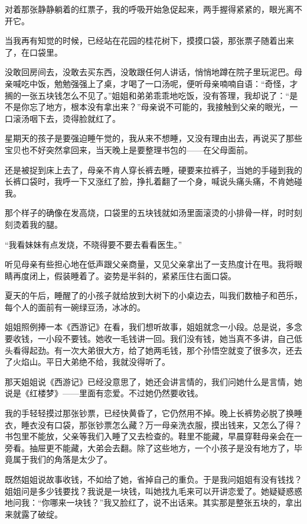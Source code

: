 \par 对着那张静静躺着的红票子，我的呼吸开始急促起来，两手握得紧紧的，眼光离不开它。
\par 当我再有知觉的时候，已经站在花园的桂花树下，摸摸口袋，那张票子随着出来了，在口袋里。
\par 没敢回房间去，没敢去买东西，没敢跟任何人讲话，悄悄地蹲在院子里玩泥巴。母亲喊吃中饭，勉勉强强上了桌，才喝了一口汤呢，便听母亲喃喃自语：“奇怪，才搁的一张五块钱怎么不见了。”姐姐和弟弟乖乖地吃饭，没有答理，我却说了：“是不是你忘了地方，根本没有拿出来？”母亲说不可能的，我接触到父亲的眼光，一口滚汤咽下去，烫得脸就红了。
\par 星期天的孩子是要强迫睡午觉的，我从来不想睡，又没有理由出去，再说买了那些宝贝也不好突然拿回来，当天晚上是要整理书包的——在父母面前。
\par 还是被捉到床上去了，母亲不肯人穿长裤去睡，硬要来拉裤子，当她的手碰到我的长裤口袋时，我呼一下又涨红了脸，挣扎着翻了一个身，喊说头痛头痛，不肯她碰我。
\par 那个样子的确像在发高烧，口袋里的五块钱就如汤里面滚烫的小排骨一样，时时刻刻烫着我的腿。
\par “我看妹妹有点发烧，不晓得要不要去看看医生。”
\par 听见母亲有些担心地在低声跟父亲商量，又见父亲拿出了一支热度计在甩。我将眼睛再度闭上，假装睡着了。姿势是半斜的，紧紧压住右面口袋。
\par 夏天的午后，睡醒了的小孩子就给放到大树下的小桌边去，叫我们数柚子和芭乐，每个人的面前有一碗绿豆汤，冰冰的。
\par 姐姐照例捧一本《西游记》在看，我们想听故事，姐姐就念一小段。总是说，多念要收钱，一小段不要钱。她收一毛钱讲一回。我们没有钱，她当真不多讲，自己低头看得起劲。有一次大弟很大方，给了她两毛钱，那个孙悟空就变了很多次，还去了火焰山。平日大弟绝不给，我就没得听了。
\par 那天姐姐说《西游记》已经没意思了，她还会讲言情的，我们问她什么是言情，她说是《红楼梦》——里面有恋爱。不过她仍然要收钱。
\par 我的手轻轻摸过那张钞票，已经快黄昏了，它仍然用不掉。晚上长裤势必脱了换睡衣，睡衣没有口袋，那张钞票怎么藏？万一母亲洗衣服，摸出钱来，又怎么了得？书包里不能放，父亲等我们入睡了又去检查的。鞋里不能藏，早晨穿鞋母亲会在一旁看。抽屉更不能藏，大弟会去翻。除了这些地方，一个小孩子是没有地方了，毕竟属于我们的角落是太少了。
\par 既然姐姐说故事收钱，不如给了她，省掉自己的重负。于是我问姐姐有没有钱找？姐姐问是多少钱要找？我说是一块钱，叫她找九毛来可以开讲恋爱了。她疑疑惑惑地问我：“你哪来一块钱？”我又脸红了，说不出话来。其实那是整张五块的，拿出来就露了破绽。
